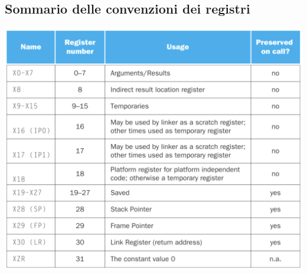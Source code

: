 \documentclass[12pt,a4paper]{article}
\begin{document}
\subsection{Sommario delle convenzioni dei registri}
\begin{center}
\includegraphics[width=0.7\columnwidth]{img/summary_register.png}
\end{center}
\end{document}
